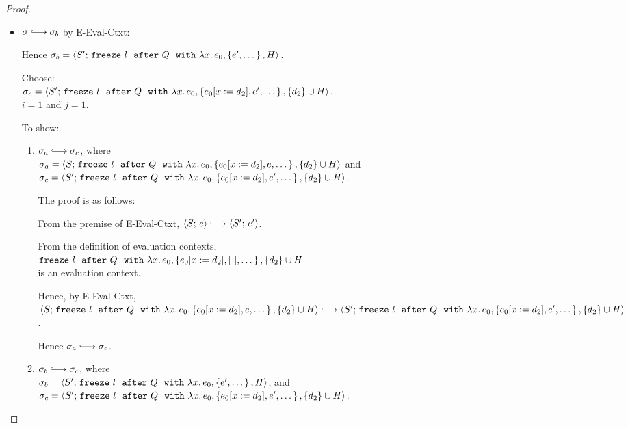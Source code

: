 \begin{proof}
\begin{itemize}
\begin{itemize}
      \item $\conf \parstepsto \conf_b$ by {\sc E-Eval-Ctxt}:

        Hence $\sigma_b =
        \langle S';\, \mbox{\texttt{freeze}}~l~~{\mbox{\texttt{after}}}~Q~~{\mbox{\texttt{with}}}~\lambda x.\,e_0, \left\{e',
              \dots\right\}, H \rangle$.


        Choose: \\
        $\sigma_c = \langle S';\, \mbox{\texttt{freeze}}~l~~{\mbox{\texttt{after}}}~Q~~{\mbox{\texttt{with}}}~\lambda x.\,e_0, \left\{e_0[x := d_2],
              e', \dots\right\}, \{d_2\}\cup H \rangle$, \\
        $i = 1$ and $j = 1$.

        To show:
        \begin{enumerate}
        \item $\conf_a \parstepsto \conf_c$, where \\
          $\sigma_a = \langle S;\, \mbox{\texttt{freeze}}~l~~{\mbox{\texttt{after}}}~Q~~{\mbox{\texttt{with}}}~\lambda x.\,e_0, \left\{e_0[x := d_2],
              e, \dots\right\}, \{d_2\}\cup H \rangle$ and \\
          $\sigma_c = \langle S';\, \mbox{\texttt{freeze}}~l~~{\mbox{\texttt{after}}}~Q~~{\mbox{\texttt{with}}}~\lambda x.\,e_0, \left\{e_0[x := d_2],
                e', \dots\right\}, \{d_2\}\cup H \rangle$.

          The proof is as follows:

          From the premise of {\sc E-Eval-Ctxt}, $\config{S}{e}
          \parstepsto \config{S'}{e'}$.

          From the definition of evaluation contexts, \\
          $\mbox{\texttt{freeze}}~l~~{\mbox{\texttt{after}}}~Q~~{\mbox{\texttt{with}}}~\lambda x.\,e_0, \left\{e_0[x := d_2],
                [~], \dots\right\}, \{d_2\}\cup H$ \\
          is an evaluation context.

          Hence, by {\sc E-Eval-Ctxt}, \\
          $\config{S}{\freezeafterfull{l}{Q}{\lam{x}{e_0}}{\setof{\subst{e_0}{x}{d_2},
              e, \dots}} {\{d_2\}\cup H}} \parstepsto \\
          \config{S'}{\freezeafterfull{l}{Q}{\lam{x}{e_0}}{\setof{\subst{e_0}{x}{d_2},
                e', \dots}} {\{d_2\}\cup H}}$.
          
          Hence $\conf_a \parstepsto \conf_c$.

        \item $\conf_b \parstepsto \conf_c$, where \\
          $\sigma_b = \langle S';\, \mbox{\texttt{freeze}}~l~~{\mbox{\texttt{after}}}~Q~~{\mbox{\texttt{with}}}~\lambda x.\,e_0, \left\{e',
              \dots\right\}, H \rangle$, and \\
          $\sigma_c = \langle S';\, \mbox{\texttt{freeze}}~l~~{\mbox{\texttt{after}}}~Q~~{\mbox{\texttt{with}}}~\lambda x.\,e_0, \left\{e_0[x := d_2],
              e', \dots\right\}, \{d_2\}\cup H \rangle$.


\end{enumerate}
\end{itemize}
\end{itemize}
\end{proof}
